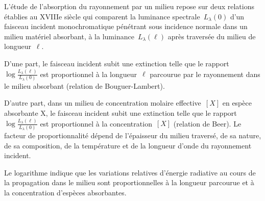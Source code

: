 \sk
L’étude de l’absorption du rayonnement par un milieu repose sur deux relations établies au XVIIIe siècle qui comparent la luminance spectrale~$L_\lambda(0)$ d'un faisceau incident monochromatique pénétrant sous incidence normale dans un milieu matériel absorbant, à la luminance~$L_\lambda(\ell)$ après traversée du milieu de longueur~$\ell$.
\begin{citemize}
\item D'une part, le faisceau incident subit une extinction telle que le rapport~$\log \frac{L_\lambda(\ell)}{L_\lambda(0)}$ est proportionnel à la longueur~$\ell$ parcourue par le rayonnement dans le milieu absorbant (relation de Bouguer-Lambert).  
\item D'autre part, dans un milieu de concentration molaire effective~$[X]$ en espèce absorbante X, le faisceau incident subit une extinction telle que le rapport~$\log \frac{L_\lambda(\ell)}{L_\lambda(0)}$ est proportionnel à la concentration~$[X]$ (relation de Beer). Le facteur de proportionnalité dépend de l'épaisseur du milieu traversé, de sa nature, de sa composition, de la température et de la longueur d'onde du rayonnement incident.
\end{citemize}
Le logarithme indique que les variations relatives d'énergie radiative au cours de la propagation dans le milieu sont proportionnelles à la longueur parcourue et à la concentration d'espèces absorbantes.

